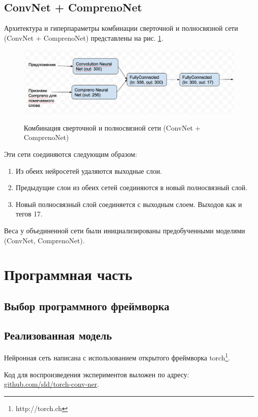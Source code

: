 \subsection{ConvNet + ComprenoNet}

Архитектура и гиперпараметры комбинации сверточной и полносвязной сети (ConvNet + ComprenoNet)
представлены на рис. \ref{figure:two_net}.
\begin{figure}[!h]
  \centering
  \caption{Комбинация сверточной и полносвязной сети (ConvNet + ComprenoNet)}
  \includegraphics[scale=0.5]{figures/two-net.png}
  \label{figure:two_net}
\end{figure}
Эти сети соединяются следующим образом:
\begin{enumerate}
  \item Из обеих нейросетей удаляются выходные слои.
  \item Предыдущие слои из обеих сетей соединяются в новый полносвязный слой.
  \item Новый полносвязный слой соединяется с выходным слоем. Выходов как и тегов 17.
\end{enumerate}
Веса у объединенной сети были инициализированы предобученными моделями (ConvNet, ComprenoNet).

\section{Программная часть}

\subsection{Выбор программного фреймворка}

\subsection{Реализованная модель}

Нейронная сеть написана с использованием открытого фреймворка torch\footnote{http://torch.ch}.

Код для воспроизведения экспериментов выложен по адресу:
\href{https://github.com/sld/torch-conv-ner}{github.com/sld/torch-conv-ner}.

